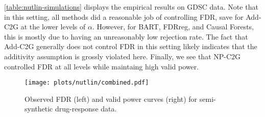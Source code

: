\cref{table:nutlin-simulations} displays the empirical results on GDSC data. Note that in this setting, all methods did a reasonable job of controlling FDR, save for Add-C2G at the lower levels of $\alpha$. However, for BART, FDRreg, and Causal Forests, this is mostly due to having an unreasonably low rejection rate. The fact that Add-C2G generally does not control FDR in this setting likely indicates that the additivity assumption is grossly violated here. Finally, we see that NP-C2G controlled FDR at all levels while maintaing high valid power.

\begin{figure*}
\centering 
\texttt{[image: plots/nutlin/combined.pdf]}
\caption{Observed FDR (left) and valid power curves (right) for semi-synthetic drug-response data.}
\end{figure*}